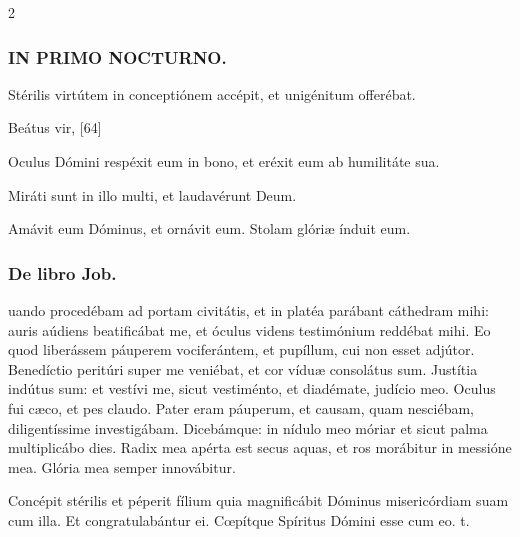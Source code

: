 \documentclass[9pt,twoside]{extarticle}
\begin{document}
\begin{multicols}{2}
\subsubsection*{\center \textsc{IN PRIMO NOCTURNO.}}
\begin{tightlist}{}
\item {} Stérilis virtútem in conceptiónem accépit, et unigénitum offerébat.
\item {} Beátus vir,  [64]
\item {} Oculus Dómini respéxit eum in bono, et eréxit eum ab humilitáte sua.
\item {} Miráti sunt in illo multi, et laudavérunt Deum.
\item {} Amávit eum Dóminus, et ornávit eum.  Stolam glóriæ índuit eum.
\item {}
\end{tightlist}

\subsubsection*{\center De libro Job.}
\begin{center}\end{center}
uando procedébam ad portam civitátis, et in platéa parábant cáthedram mihi: auris aúdiens beatificábat me, et óculus videns testimónium reddébat mihi. Eo quod liberássem páuperem vociferántem, et pupíllum, cui non esset adjútor. Benedíctio peritúri super me veniébat, et cor víduæ consolátus sum. Justítia indútus sum: et vestívi me, sicut vestiménto, et diadémate, judício meo. Oculus fui cæco, et pes claudo. Pater eram páuperum, et causam, quam nesciébam, diligentíssime investigábam. Dicebámque: in nídulo meo móriar et sicut palma multiplicábo dies. Radix mea apérta est secus aquas, et ros morábitur in messióne mea. Glória mea semper innovábitur.

\begin{tightlist}{}
\item {} Concépit stérilis et péperit fílium quia magnificábit Dóminus misericórdiam suam cum illa. \textred{*} Et congratulabántur ei.  Cœpítque Spíritus Dómini esse cum eo. t.
\end{tightlist}


\end{multicols}
\end{document}
